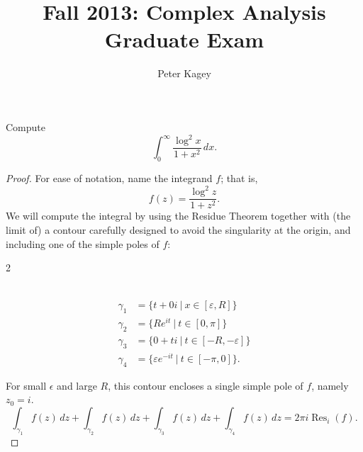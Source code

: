 \documentclass{article}
\newenvironment{problem}[2][Problem]{\begin{trivlist}
\item[\hskip \labelsep {\bfseries #1}\hskip \labelsep {\bfseries #2.}]}{\end{trivlist}}
\begin{document}
\title{Fall 2013: Complex Analysis Graduate Exam}
\author{Peter Kagey}

\maketitle

\begin{problem}{1}
  Compute \[
    \int_0^\infty \frac{\log^2 x}{1 + x^2}\,dx.
  \]
\end{problem}

\begin{proof}
  For ease of notation, name the integrand $f$; that is, \[
    f(z) = \frac{\log^2 z}{1 + z^2}.
  \]
  We will compute the integral by using the Residue Theorem together with (the
  limit of) a contour carefully designed to avoid the singularity at the
  origin, and including one of the simple poles of $f$:
  \begin{multicols}{2}
  \\
  \begin{align}
    \gamma_{1} &= \{t + 0i\ |\ x \in [\varepsilon, R] \} \\
    \gamma_{2} &= \{R e^{it}\ |\ t \in [0,\pi] \} \\
    \gamma_{3} &= \{0 + ti\ |\ t \in [-R, -\varepsilon]\} \\
    \gamma_{4} &= \{\varepsilon e^{-it}\ |\ t \in [-\pi, 0]\}.
  \end{align}
  \end{multicols}
  For small $\epsilon$ and large $R$, this contour encloses a
  single simple pole of $f$, namely $z_0 = i$.
  \[
    \int_{\gamma_1} f(z)\,dz +
    \int_{\gamma_2} f(z)\,dz +
    \int_{\gamma_3} f(z)\,dz +
    \int_{\gamma_4} f(z)\,dz =
    2\pi i \operatorname{Res}_i(f).
  \]
\end{proof}
\end{document}
